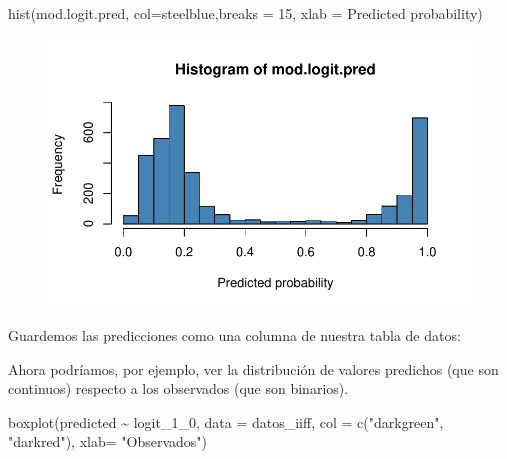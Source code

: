 \documentclass[
  letterpaper,
  DIV=11,
  numbers=noendperiod]{scrreprt}
\newenvironment{Shaded}{\begin{snugshade}}{\end{snugshade}}
\newcommand{\AttributeTok}[1]{\textcolor[rgb]{0.40,0.45,0.13}{#1}}
\newcommand{\DecValTok}[1]{\textcolor[rgb]{0.68,0.00,0.00}{#1}}
\newcommand{\FunctionTok}[1]{\textcolor[rgb]{0.28,0.35,0.67}{#1}}
\newcommand{\NormalTok}[1]{\textcolor[rgb]{0.00,0.23,0.31}{#1}}
\newcommand{\OtherTok}[1]{\textcolor[rgb]{0.00,0.23,0.31}{#1}}
\newcommand{\SpecialCharTok}[1]{\textcolor[rgb]{0.37,0.37,0.37}{#1}}
\newcommand{\StringTok}[1]{\textcolor[rgb]{0.13,0.47,0.30}{#1}}
\begin{document}
\begin{Shaded}
\begin{Highlighting}[]
\FunctionTok{hist}\NormalTok{(mod.logit.pred, }\AttributeTok{col=}\StringTok{\textquotesingle{}steelblue\textquotesingle{}}\NormalTok{,}\AttributeTok{breaks =} \DecValTok{15}\NormalTok{, }\AttributeTok{xlab =} \StringTok{\textquotesingle{}Predicted probability\textquotesingle{}}\NormalTok{)}
\end{Highlighting}
\end{Shaded}

\begin{figure}[H]

{\centering \includegraphics{02_GLM_files/figure-pdf/unnamed-chunk-11-1.pdf}

}

\end{figure}

Guardemos las predicciones como una columna de nuestra tabla de datos:

\begin{Shaded}
\end{Shaded}

Ahora podríamos, por ejemplo, ver la distribución de valores predichos
(que son continuos) respecto a los observados (que son binarios).

\begin{Shaded}
\begin{Highlighting}[]
\FunctionTok{boxplot}\NormalTok{(predicted }\SpecialCharTok{\textasciitilde{}}\NormalTok{ logit\_1\_0, }\AttributeTok{data =}\NormalTok{ datos\_iiff, }\AttributeTok{col =} \FunctionTok{c}\NormalTok{(}\StringTok{"darkgreen"}\NormalTok{, }\StringTok{"darkred"}\NormalTok{), }\AttributeTok{xlab=} \StringTok{"Observados"}\NormalTok{)}
\end{Highlighting}
\end{Shaded}
\end{document}
